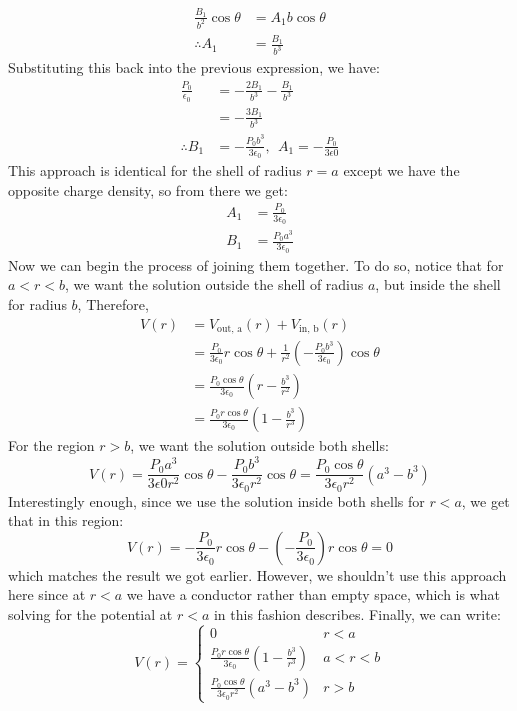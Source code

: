 \documentclass[10pt]{article}
\begin{document}
\begin{solution}
\begin{align*}
			\frac{B_1}{b^2}\cos \theta &= A_1 b \cos \theta\\
			\therefore A_1 &= \frac{B_1}{b^3}
		\end{align*}
		Substituting this back into the previous expression, we have: 
		\begin{align*}
			\frac{P_0}{\epsilon_0} &= -\frac{2B_1}{b^3} - \frac{B_1}{b^3} \\
			&= -\frac{3B_1}{b^3} \\
			\therefore B_1 &= -\frac{P_0b^3}{3\epsilon_0}, \ \ A_1 = -\frac{P_0}{3 \epsilon 0}
		\end{align*}
		This approach is identical for the shell of radius $r = a$ except we have the opposite charge density, 
		so from there we get:
		\begin{align*}
			A_1 &= \frac{P_0}{3 \epsilon_0} \\
			B_1 &= \frac{P_0a^3}{3\epsilon_0}
		\end{align*}
		Now we can begin the process of joining them together. To do so, notice that for $a < r < b$, we want
		the solution outside the shell of radius $a$, but inside the shell for radius $b$, Therefore, 
		\begin{align*}
			V(r) &= V_{\text{out, a}}(r) + V_{\text{in, b}}(r) \\
			&= \frac{P_0}{3\epsilon_0}r \cos \theta + \frac{1}{r^2}\left( -\frac{P_0b^3}{3 \epsilon_0} \right) 
			\cos \theta \\
			&= \frac{P_0 \cos \theta}{3\epsilon_0}\left( r - \frac{b^3}{r^2} \right)  \\
			&= \frac{P_0 r \cos \theta }{3\epsilon_0}\left( 1 - \frac{b^3}{r^3} \right) 
		\end{align*}
		For the region $r > b$, we want the solution outside both shells:
		\[
		 V(r) = \frac{P_0a^3}{3\epsilon 0 r^2}\cos \theta - \frac{P_0b^3}{3\epsilon_0r^2}\cos \theta 
		 = \frac{P_0 \cos \theta}{3\epsilon_0r^2}(a^3 - b^3)
		\] 
		Interestingly enough, since we use the solution inside both shells for $r < a$, we get that in this
		region: 
		\[
		V(r) = -\frac{P_0}{3\epsilon_0}r \cos \theta - \left( -\frac{P_0}{3\epsilon_0} \right) r \cos \theta = 0
		\] 
		which matches the result we got earlier. However, we shouldn't use this approach here since at $r < a$
		we have a conductor rather than empty space, which is what solving for the potential at $r < a$ 
		in this fashion describes. Finally, we can write:
		\[
		V(r) = \begin{cases}
			 0 & r< a\\
			 \displaystyle \frac{P_0 r \cos \theta}{3\epsilon_0}\left( 1 - \frac{b^3}{r^3} \right) & a < r < b\\
			 \displaystyle \frac{P_0 \cos \theta}{3\epsilon_0r^2}(a^3 - b^3) & r > b
		\end{cases}
		\] 
	\end{solution}
\end{document}

